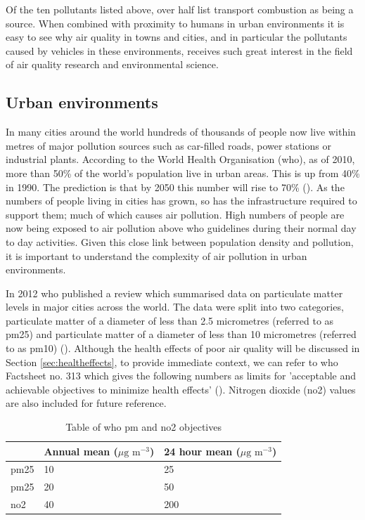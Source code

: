 Of the ten pollutants listed above, over half list transport combustion as being a source. When combined with proximity to humans in urban environments it is easy to see why air quality in towns and cities, and in particular the pollutants caused by vehicles in these environments, receives such great interest in the field of air quality research and environmental science.


\subsection{Urban environments}
\label{subsec:urbanenvironments}
In many cities around the world hundreds of thousands of people now live within metres of major pollution sources such as car-filled roads, power stations or industrial plants. According to the World Health Organisation (\gls{who}), as of 2010, more than 50\% of the world’s population live in urban areas. This is up from 40\% in 1990. The prediction is that by 2050 this number will rise to 70\% (\cite{GlobalHealthObservatory2012}). As the numbers of people living in cities has grown, so has the infrastructure required to support them; much of which causes air pollution. High numbers of people are now being exposed to air pollution above \gls{who} guidelines during their normal day to day activities. Given this close link between population density and pollution, it is important to understand the complexity of air pollution in urban environments.

In 2012 \gls{who} published a review which summarised data on particulate matter levels in major cities across the world. The data were split into two categories, particulate matter of a diameter of less than 2.5 micrometres (referred to as \gls{pm25}) and particulate matter of a diameter of less than 10 micrometres (referred  to as \gls{pm10})  (\cite{WorldHealthOrganization2012}). Although the health effects of poor air quality will be discussed in Section \ref{sec:healtheffects}, to provide immediate context, we can refer to \gls{who} Factsheet no. 313 which gives the following numbers as limits for 'acceptable and achievable objectives to minimize health effects' (\cite{WorldHealthOrganization2011}). Nitrogen dioxide (\gls{no2}) values are also included for future reference.

\begin{table}[H]
\caption{Table of \gls{who} \gls{pm} and \gls{no2} objectives}
\centering
    \begin{tabular}{ | l | l | l |}
    \hline 
     & Annual mean ($\mu \text{g m}^{-3}$) & 24 hour mean ($\mu \text{g m}^{-3}$) \\ \hline
     \gls{pm25} & 10 & 25\\ \hline
     \gls{pm25} & 20 & 50\\ \hline
     \gls{no2} & 40 & 200\\ \hline
    \end{tabular}
\label{tab:whopmlevels}
\end{table}

